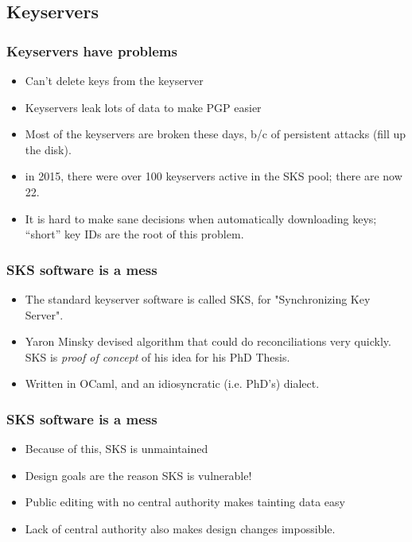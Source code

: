 \documentclass[aspectratio=1610,bigger,utf8]{beamer}
\begin{document}
\subsection{Keyservers}


\begin{frame}
	\frametitle{Keyservers have problems}
	\begin{itemize}
		\item Can't delete keys from the keyserver
		\item Keyservers leak lots of data to make PGP easier
		\item Most of the keyservers are broken these days, b/c of
			persistent attacks (fill up the disk).
		\item in 2015, there were over 100 keyservers active in the
			SKS pool; there are now 22.
		\item It is hard to make sane decisions when automatically
			downloading keys; ``short'' key IDs are the root of this
			problem.
	\end{itemize}
\end{frame}

%
%

\begin{frame}
	\frametitle{SKS software is a mess}
	\begin{itemize}
		\item The standard keyserver software is called SKS, for
			"Synchronizing Key Server".
		\item \alert{Yaron Minsky} devised algorithm that could do
			reconciliations very quickly. SKS is \emph{proof of
			concept} of his idea for his PhD Thesis.
		\item Written in OCaml, and an idiosyncratic (i.e. PhD's)
			dialect.
	\end{itemize}
\end{frame}
\begin{frame}
	\frametitle{SKS software is a mess}
	\begin{itemize}
		\item Because of this, \alert{SKS is unmaintained}
		\item Design goals are the reason SKS is vulnerable!
		\item Public editing with no central authority makes tainting
			data easy
		\item Lack of central authority also makes design changes
			impossible.
	\end{itemize}
\end{frame}
\end{document}
